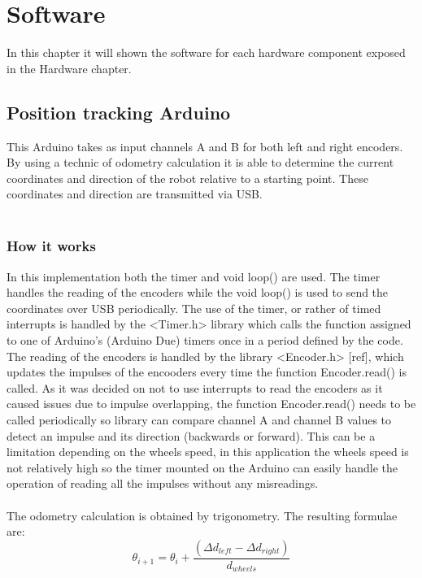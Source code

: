 \chapter{Software}
In this chapter it will shown the software for each hardware component exposed in the Hardware chapter.

\section{Position tracking Arduino}
This Arduino takes as input channels A and B for both left and right encoders. By using a technic of odometry calculation it is able to determine the current 
coordinates and direction of the robot relative to a starting point. These coordinates and direction are transmitted via USB.
\\ \\

\subsection{How it works}
In this implementation both the timer and void loop() are used. The timer handles the reading of the encoders while the void loop() is used 
to send the coordinates over USB periodically. The use of the timer, or rather of timed interrupts is handled by the <Timer.h> library which calls the function assigned to 
one of Arduino's (Arduino Due) timers once in a period defined by the code.
\\
The reading of the encoders is handled by the library <Encoder.h> [ref], which updates the impulses of the encooders every time the function Encoder.read() is called. As it was decided 
on not to use interrupts to read the encoders as it caused issues due to impulse overlapping, the function Encoder.read() needs to be called periodically so library can compare 
channel A and channel B values to detect an impulse and its direction (backwards or forward). This can be a limitation depending on the wheels speed, in this application the wheels speed 
is not relatively high so the timer mounted on the Arduino can easily handle the operation of reading all the impulses without any misreadings.
\\ \\
The odometry calculation is obtained by trigonometry. The resulting formulae are:
\\
\begin{equation}
    \theta_{i+1} = \theta_{i} + \frac{(\Delta d_{left} - \Delta d_{right})}{d_{wheels}}
\end{equation}


